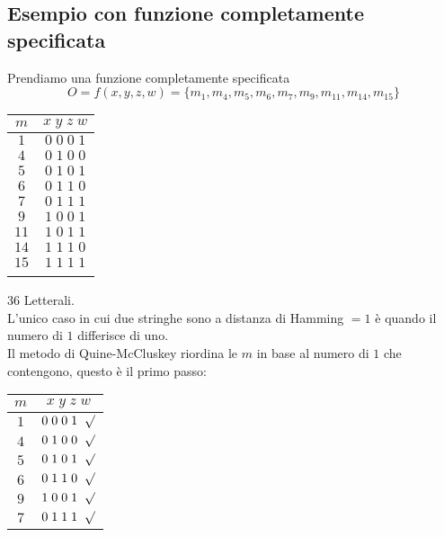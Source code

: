 \documentclass[a4paper]{article}
\theoremstyle{break}
\theoremstyle{break}
\theoremstyle{break}
\theoremstyle{break}
\begin{document}
\subsection{Esempio con funzione completamente specificata}
\begin{example}
    Prendiamo una funzione completamente specificata
   \[
       O = f(x,y,z,w) = \{ m_1, m_4, m_5, m_6, m_7, m_9, m_{11}, m_{14}, m_{15} \}
   \]  
   \begin{center}
       \begin{tabular}{c|c}
           \( m \) & \( x\;y\;z\;w \)\\
           \hline
           \( 1 \) & \( 0\;0\;0\;1 \)\\ 
           \( 4 \) & \( 0\;1\;0\;0 \)\\
           \( 5 \) & \( 0\;1\;0\;1 \)\\
           \( 6 \) & \( 0\;1\;1\;0 \)\\
           \( 7 \) & \( 0\;1\;1\;1 \)\\
           \( 9 \) & \( 1\;0\;0\;1 \)\\ 
           \( 11 \) & \( 1\;0\;1\;1 \)\\
           \( 14 \) & \( 1\;1\;1\;0 \)\\
           \( 15 \) & \( 1\;1\;1\;1 \)\\
           \label{tab:quine-mccluskey1}
    \end{tabular}
   \end{center}
   36 Letterali.\\
   L'unico caso in cui due stringhe sono a distanza di Hamming \( =1 \) è quando il numero di \( 1 \) differisce di uno.\\
   Il metodo di Quine-McCluskey riordina le \( m \)  in base al numero di \( 1 \) che contengono,
   questo è il primo passo:
      \begin{center}
       \begin{tabular}{c|c}
           \( m \) & \( x\;y\;z\;w \)\\
           \hline
           \( 1 \) & \( 0\;0\;0\;1\;\;\surd \)\\ 
           \( 4 \) & \( 0\;1\;0\;0\;\;\surd \)\\
           \hline
           \( 5 \) & \( 0\;1\;0\;1\;\;\surd \)\\
           \( 6 \) & \( 0\;1\;1\;0\;\;\surd \)\\
           \( 9 \) & \( 1\;0\;0\;1\;\;\surd \)\\ 
           \hline
           \( 7 \) & \( 0\;1\;1\;1\;\;\surd \)\\

\end{tabular}
\end{center}
\end{example}
\end{document}

